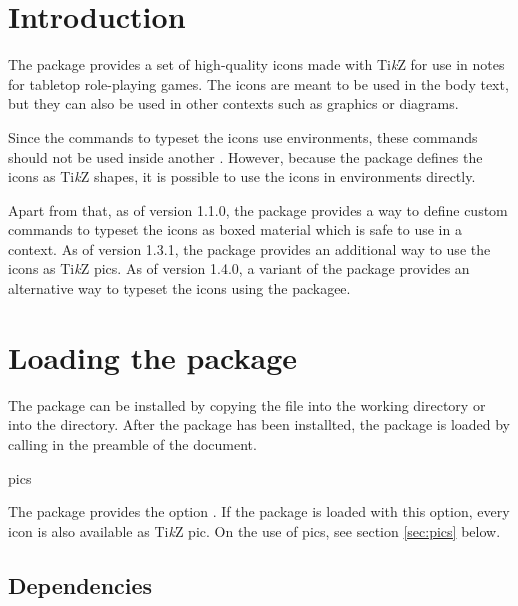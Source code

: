 \documentclass[a4paper]{article}
\begin{document}
\vspace*{-1cm}
\noindent\dndiconslogo[3]

\bigskip

\printdoctitle

\bigskip

\section{Introduction}

The  package provides a set of high-quality icons made with Ti\emph{k}Z for use in notes for tabletop role-playing games. The icons are meant to be used in the body text, but they can also be used in other contexts such as graphics or diagrams.

Since the commands to typeset the icons use  environments, these commands should not be used inside another . However, because the package defines the icons as Ti\emph{k}Z shapes, it is possible to use the icons in  environments directly. 

Apart from that, as of version 1.1.0, the package provides a way to define custom commands to typeset the icons as boxed material which is safe to use in a  context. As of version 1.3.1, the package provides an additional way to use the icons as Ti\emph{k}Z pics. As of version 1.4.0, a variant of the package provides an alternative way to typeset the icons using the  packagee.

\section{Loading the package}

The package can be installed by copying the file  into the working directory or into the  directory. After the package has been installted, the  package is loaded by calling \macro{\usepackage{dndicons}} in the preamble of the document. 

\begin{macrodef}pics\end{macrodef}
The package provides the option . If the package is loaded with this option, every icon is also available as Ti\emph{k}Z pic. On the use of pics, see section \ref{sec:pics} below.

\subsection{Dependencies}
\end{document}
